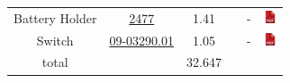 \documentclass[12pt,a4paper,landscape]{article}
\begin{document}
{\begin{tabular}{|c|c|c|c|c|c|}
					Battery Holder &
					\href{http://fr.farnell.com/keystone/2477/battery-holder-pcb/dp/1650684}
					{2477} & 1.41 & &
					- &
					\href{http://www.farnell.com/datasheets/1703957.pdf}{\includegraphics[height=1em]{pdf.png}}\\
					    
					Switch &
					\href{http://fr.farnell.com/eoz/09-03290-01/commutateur-a-glissiere/dp/674345}
					{09-03290.01} & 1.05 & &
					- &
					\href{http://www.farnell.com/datasheets/2010029.pdf}{\includegraphics[height=1em]{pdf.png}}\\
					    
					\hline
					total & & 32.647 & & &\\
					\hline
				\end{tabular}
			}
\end{document}
